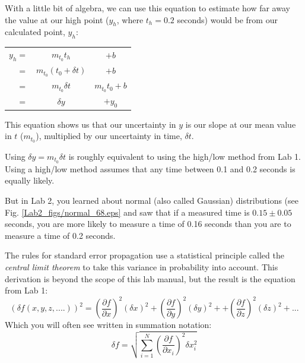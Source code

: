\documentclass[twoside,11pt,ShortChapTitles]{BYUTextbook}
\begin{document}
With a little bit of algebra, we can use this equation to estimate how far away the value at our high point ($y_h$, where $t_h=0.2$ seconds) would be from our calculated point, $y_h$:

\begin{tabular}{rcc}
$y_h =$& $m_{t_0}t_h$ &$+b$ \\
$=$& $m_{t_0}\left(t_0+\delta t\right) $&$ + b$\\
$=$& $m_{t_0}\delta t$ & $m_{t_0}t_0 + b$\\
$=$& $\delta y$ & $+ y_0$
\end{tabular}

\noindent This equation shows us that our uncertainty in $y$ is our slope at our mean value in $t$ ($m_{t_0}$), multiplied by our uncertainty in time, $\delta t$.

Using $\delta y = m_{t_0}\delta t$ is roughly equivalent to using the high/low method from Lab 1. Using a high/low method assumes that any time between 0.1 and 0.2 seconds is equally likely.

But in Lab 2, you learned about normal (also called Gaussian) distributions (see Fig. \ref{Lab2_figs/normal_68.eps}
and saw that if a measured time is $0.15 \pm 0.05$ seconds, you are more likely to measure a time of 0.16 seconds than you are to measure a time of 0.2 seconds.

The rules for standard error propagation use a statistical principle called the {\em central limit theorem} to take this variance in probability into account.  This derivation is beyond the scope of this lab manual, but the result is the equation from Lab 1:
 \[
 \left(\delta f(x,y,z,....)\right)^2 = \left(\frac{\partial f}{\partial x}\right)^2(\delta x)^2+ \left(\frac{\partial f}{\partial y}\right)^2(\delta y)^2++ \left(\frac{\partial f}{\partial z}\right)^2(\delta z)^2+...
 \]
Which you will often see written in summation notation:
\[
\delta f=\sqrt{\sum_{i=1}^{N}\left(  \frac{\partial f}{\partial x_{i}}\right)
^{2}\delta x_{i}^{2}}
\]
\end{document}
